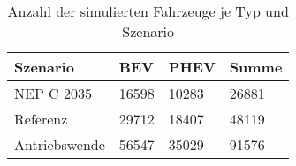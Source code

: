 {
\renewcommand{\arraystretch}{1.2}%
\begin{table}[H]
	\begin{center}
		\caption{Anzahl der simulierten Fahrzeuge je Typ und Szenario}
		\begin{tabu} to 0.6\textwidth {X[1.2] X[1, r] X[1, r] X[1, r]}
			\hline
			Szenario         & BEV         & PHEV        & Summe       \\ \hline
			NEP C \num{2035} & \num{16598} & \num{10283} & \num{26881} \\
			Referenz         & \num{29712} & \num{18407} & \num{48119} \\
			Antriebswende    & \num{56547} & \num{35029} & \num{91576} \\ \hline
		\end{tabu}
		\label{tab:car_count}
	\end{center}
	\vspace{-3mm}%
\end{table}
}